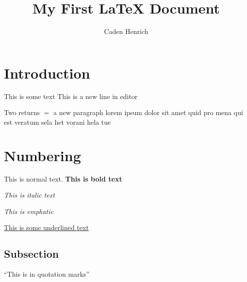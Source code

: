 \documentclass{article}
\author{Caden Henrich}
\title{My First {\LaTeX} Document}
\begin{document}
\maketitle

\section{Introduction}

This is some text
This is a new line in editor

Two returns $=$ a new paragraph lorem ipsum dolor sit amet quid pro mena qui est veratum sela het vorani hela tue

\section{Numbering}

This is normal text. \textbf{This is bold text}

\textit{This is italic text}

\emph{This is emphatic}

\underline{This is some underlined text}

\subsection{Subsection}

``This is in quotation marks''
\end{document}

